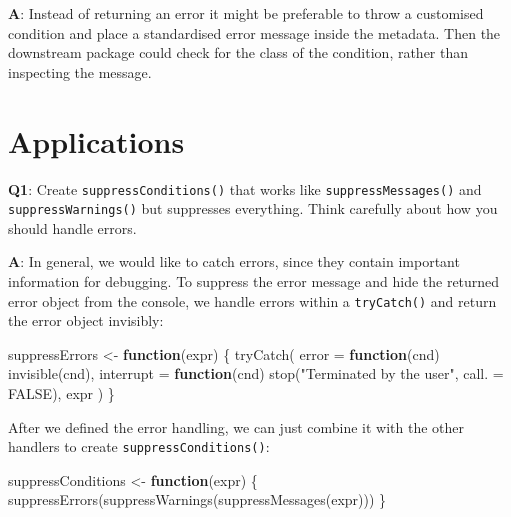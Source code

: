 \documentclass[
]{krantz}
\makeatletter
\newenvironment{Shaded}{\begin{snugshade}}{\end{snugshade}}
\newcommand{\ControlFlowTok}[1]{\textcolor[rgb]{0.13,0.29,0.53}{\textbf{#1}}}
\newcommand{\DataTypeTok}[1]{\textcolor[rgb]{0.13,0.29,0.53}{#1}}
\newcommand{\KeywordTok}[1]{\textcolor[rgb]{0.13,0.29,0.53}{\textbf{#1}}}
\newcommand{\NormalTok}[1]{#1}
\newcommand{\OtherTok}[1]{\textcolor[rgb]{0.56,0.35,0.01}{#1}}
\newcommand{\StringTok}[1]{\textcolor[rgb]{0.31,0.60,0.02}{#1}}
\newenvironment{kframe}{%
\medskip{}
\setlength{\fboxsep}{.8em}
 \def\at@end@of@kframe{}%
 \ifinner\ifhmode%
  \def\at@end@of@kframe{\end{minipage}}%
  \begin{minipage}{\columnwidth}%
 \fi\fi%
 \def\FrameCommand##1{\hskip\@totalleftmargin \hskip-\fboxsep
 \colorbox{shadecolor}{##1}\hskip-\fboxsep
     \hskip-\linewidth \hskip-\@totalleftmargin \hskip\columnwidth}%
 \MakeFramed {\advance\hsize-\width
   \@totalleftmargin\z@ \linewidth\hsize
   \@setminipage}}%
 {\par\unskip\endMakeFramed%
 \at@end@of@kframe}
\renewenvironment{Shaded}{\begin{kframe}}{\end{kframe}}
\renewcommand{\KeywordTok} [1]{\textcolor[rgb]{0.00,0.44,0.13}{{#1}}}
\renewcommand{\DataTypeTok}[1]{\textcolor[rgb]{0.56,0.13,0.00}{{#1}}}
\renewcommand{\StringTok}  [1]{\textcolor[rgb]{0.25,0.44,0.63}{{#1}}}
\renewcommand{\OtherTok}   [1]{\textcolor[rgb]{0.00,0.44,0.13}{{#1}}}
\renewcommand{\NormalTok}  [1]{{#1}}
\makeatother
\begin{document}
\textbf{{A}}: Instead of returning an error it might be preferable to throw a customised condition and place a standardised error message inside the metadata. Then the downstream package could check for the class of the condition, rather than inspecting the message.

\hypertarget{applications-1}{%
\section{Applications}\label{applications-1}}

\textbf{{Q1}}: Create \texttt{suppressConditions()} that works like \texttt{suppressMessages()} and \texttt{suppressWarnings()} but suppresses everything. Think carefully about how you should handle errors.

\textbf{{A}}: In general, we would like to catch errors, since they contain important information for debugging. To suppress the error message and hide the returned error object from the console, we handle errors within a \texttt{tryCatch()} and return the error object invisibly:

\begin{Shaded}
\begin{Highlighting}[]
\NormalTok{suppressErrors <-}\StringTok{ }\ControlFlowTok{function}\NormalTok{(expr) \{}
  \KeywordTok{tryCatch}\NormalTok{(}
    \DataTypeTok{error =} \ControlFlowTok{function}\NormalTok{(cnd) }\KeywordTok{invisible}\NormalTok{(cnd),}
    \DataTypeTok{interrupt =} \ControlFlowTok{function}\NormalTok{(cnd) }\KeywordTok{stop}\NormalTok{(}\StringTok{"Terminated by the user"}\NormalTok{,}
                                   \DataTypeTok{call. =} \OtherTok{FALSE}\NormalTok{),}
\NormalTok{    expr}
\NormalTok{  )}
\NormalTok{\}}
\end{Highlighting}
\end{Shaded}

After we defined the error handling, we can just combine it with the other handlers to create \texttt{suppressConditions()}:

\begin{Shaded}
\begin{Highlighting}[]
\NormalTok{suppressConditions <-}\StringTok{ }\ControlFlowTok{function}\NormalTok{(expr) \{}
  \KeywordTok{suppressErrors}\NormalTok{(}\KeywordTok{suppressWarnings}\NormalTok{(}\KeywordTok{suppressMessages}\NormalTok{(expr)))}
\NormalTok{\}}
\end{Highlighting}
\end{Shaded}
\end{document}
